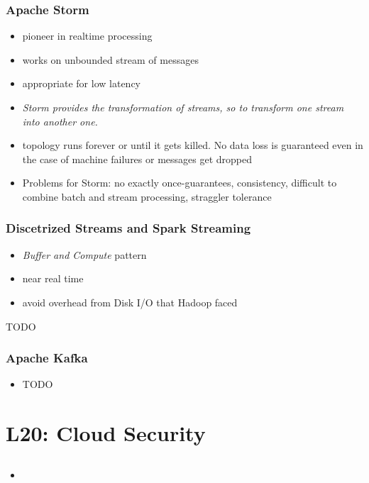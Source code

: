 \documentclass[a4paper]{article}
\begin{document}
\begin{multicols}{3}
\subsubsection{Apache Storm}
\begin{itemize}
    \item pioneer in realtime processing
    \item works on unbounded stream of messages 
    \item appropriate for low latency
    \item \textit{Storm provides the transformation of streams, so to transform one stream into another one.}
    \item topology runs forever or until it gets killed. No data loss is guaranteed even in the case of machine failures or messages get dropped
    \item Problems for Storm: no exactly once-guarantees, consistency, difficult to combine batch and stream processing, straggler tolerance
\end{itemize}

\subsubsection{Discetrized Streams and Spark Streaming}
\begin{itemize}
    \item \textit{Buffer and Compute} pattern
    \item near real time
    \item avoid overhead from Disk I/O that Hadoop faced 
\end{itemize}
TODO

\subsubsection{Apache Kafka}
\begin{itemize}
    \item TODO
\end{itemize}

\section{L20: Cloud Security}

\subsection{}
\begin{itemize}
    \item 
\end{itemize}


\end{multicols}
\end{document}
